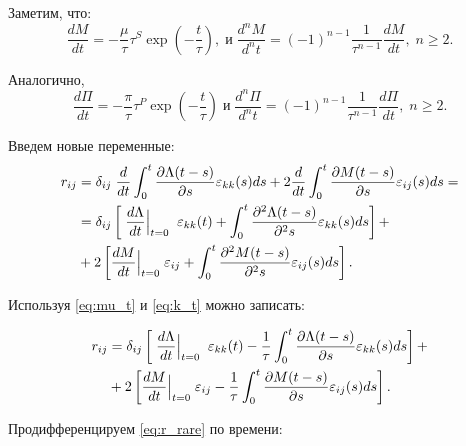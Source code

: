 \documentclass[a4paper, fontsize=14pt]{article}
\begin{document}
Заметим, что:
\begin{equation}
    \label{eq:mu_t}
    \frac{d M}{d t} = - \frac{\mu}{\tau} \tau^S \exp \left( - \frac{t}{\tau}\right), \; \text{и} \;  \frac{d^n M}{d^n t} = (-1)^{n-1} \frac{1}{\tau^{n-1}} \frac{d M}{d t}, \; n \geq 2. 
\end{equation}

Аналогично,
\begin{equation}
    \label{eq:k_t}
    \frac{d \Pi}{d t} = - \frac{\pi}{\tau} \tau^P \exp \left( - \frac{t}{\tau}\right)  \; \text{и} \;  \frac{d^n \Pi}{d^n t} = (-1)^{n-1} \frac{1}{\tau^{n-1}} \frac{d \Pi}{dt}, \; n \geq 2. 
\end{equation}



Введем новые переменные:
\begin{equation*}
    \begin{aligned}
        r_{ij} &= \delta_{ij} \; \frac{d}{dt} \int_0^t \frac{\partial \Lambda(t - s)}{\partial s}  \varepsilon_{kk}(s) ds + 2 \frac{d}{dt} \int_0^t \frac{\partial M(t - s)}{\partial s}  \varepsilon_{ij}(s) ds = \\
           & = \delta_{ij} \left[\; \frac{d \Lambda}{d t}\Big{|}_{t = 0} \;  \; \varepsilon_{kk} (t) + \int_0^t \frac{\partial^2 \Lambda(t - s)}{\partial^2 s} \varepsilon_{kk}(s) ds \right] + \\ 
           & + 2 \left[ \frac{d M}{d t}\Big{|}_{t = 0} \;  \varepsilon_{ij} + \int_0^t \frac{\partial^2 M(t - s)}{\partial^2 s} \varepsilon_{ij}(s) ds \right] 
    .\end{aligned}
\end{equation*}

Используя \eqref{eq:mu_t} и \eqref{eq:k_t} можно записать:

\begin{equation}
    \label{eq:r_rare}
    \begin{aligned}
        r_{ij} &= \delta_{ij} \left[\; \frac{d \Lambda}{d t}\Big{|}_{t = 0} \;  \; \varepsilon_{kk} (t) - \frac{1}{\tau} \int_0^t \frac{\partial \Lambda(t - s)}{\partial s} \varepsilon_{kk}(s) ds \right] + \\ 
           & + 2 \left[ \frac{d M}{d t}\Big{|}_{t = 0} \;  \varepsilon_{ij} - \frac{1}{\tau} \int_0^t \frac{\partial M(t - s)}{\partial s} \varepsilon_{ij}(s) ds \right].
    \end{aligned}
\end{equation}

Продифференцируем \eqref{eq:r_rare} по времени:
\end{document}
